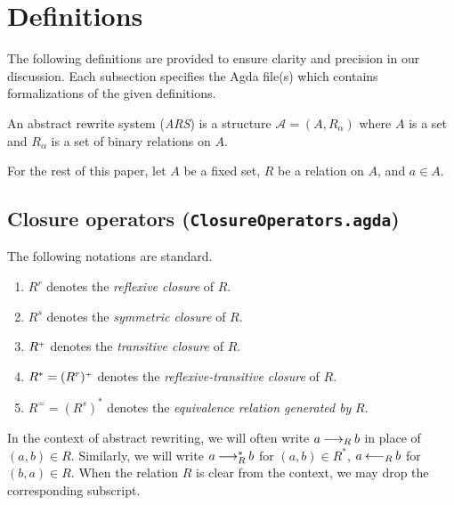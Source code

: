 \section{Definitions}
\label{sec:Definitions}
The following definitions are provided to ensure clarity and precision
in our discussion. Each subsection specifies the Agda file(s) which contains formalizations of the given definitions.

\begin{definition}
    An abstract rewrite system (\emph{ARS}) is a structure $\mathcal{A} = (A, R_\alpha)$ where
     $A$ is a set and $R_\alpha$ is a set of binary relations on $A$.
\end{definition}

For the rest of this paper, let $A$ be a fixed set, $R$ be a relation on $A$, and $a \in A$.



\subsection{Closure operators (\texttt{ClosureOperators.agda})}

\begin{notation} 
The following notations are standard.
  \begin{enumerate}
    \item $R^r$ denotes the \emph{reflexive closure} of $R$.
    \item $R^s$ denotes the \emph{symmetric closure} of $R$.
    \item ${R}^{\scriptscriptstyle{+}}$ denotes the \emph{transitive closure} of $R$.
    \item $R^* = (R^r){}^{\scriptscriptstyle{+}}$ denotes the \emph{reflexive-transitive closure} of $R$.
    \item $R^= = (R^s)^*$ denotes the \emph{equivalence relation generated by} $R$.
  \end{enumerate}
\end{notation}




In the context of abstract rewriting, we will often write $a \mathbin{\longrightarrow_R} b$
in place of $(a,b) \in R$.  Similarly, we will write $a \mathbin{\longrightarrow_R^*} b$ for $(a,b) \in R^*$,
$a \mathbin{\longleftarrow_R} b$ for $(b,a) \in R$.  When the relation $R$ is clear from the context,
we may drop the corresponding subscript.

